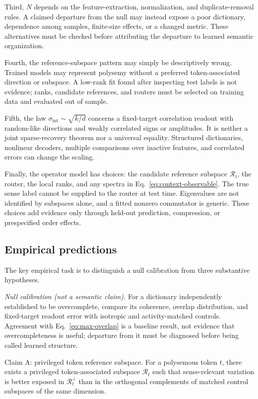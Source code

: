 \documentclass[
  aps,
  reprint,
  superscriptaddress,
  floatfix,
  nofootinbib,
  longbibliography
]{revtex4-2}
\newcommand{\sint}{\sigma_{\mathrm{int}}}
\begin{document}
Third, $N$ depends on the feature-extraction, normalization, and
duplicate-removal rules.  A claimed departure from the null may instead expose
a poor dictionary, dependence among samples, finite-size effects, or a changed
metric.  These alternatives must be checked before attributing the departure
to learned semantic organization.

Fourth, the reference-subspace pattern may simply be descriptively wrong.
Trained models may represent polysemy without a preferred token-associated
direction or subspace.  A low-rank fit found after inspecting test labels is
not evidence; ranks, candidate references, and routers must be selected on
training data and evaluated out of sample.

Fifth, the law $\sint\sim\sqrt{k/d}$ concerns a fixed-target correlation
readout with random-like directions and weakly correlated signs or amplitudes.
It is neither a joint sparse-recovery theorem nor a universal equality.
Structured dictionaries, nonlinear decoders, multiple comparisons over
inactive features, and correlated errors can change the scaling.

Finally, the operator model has choices: the candidate reference subspace
$\mathcal R_t$, the router, the local ranks, and any spectra in
Eq.~\eqref{eq:context-observable}.  The true sense label cannot be supplied to
the router at test time.  Eigenvalues are not identified by subspaces alone,
and a fitted nonzero commutator is generic.  These choices add evidence only
through held-out prediction, compression, or prespecified order effects.

\subsection{Empirical predictions}
\label{sec:predictions}

The key empirical task is to distinguish a null calibration from three
substantive hypotheses.

\emph{Null calibration (not a semantic claim).}
For a dictionary independently established to be overcomplete, compare its
coherence, overlap distribution, and fixed-target readout error with isotropic
and activity-matched controls.  Agreement with Eq.~\eqref{eq:max-overlap} is a
baseline result, not evidence that overcompleteness is useful; departure from
it must be diagnosed before being called learned structure.

{Claim A: privileged token reference subspace.}
For a polysemous token $t$, there exists a privileged token-associated
subspace $\mathcal R_t$ such that sense-relevant variation is better
exposed in $\mathcal R_t^\perp$ than in the orthogonal complements of
matched control subspaces of the same dimension.
\end{document}
